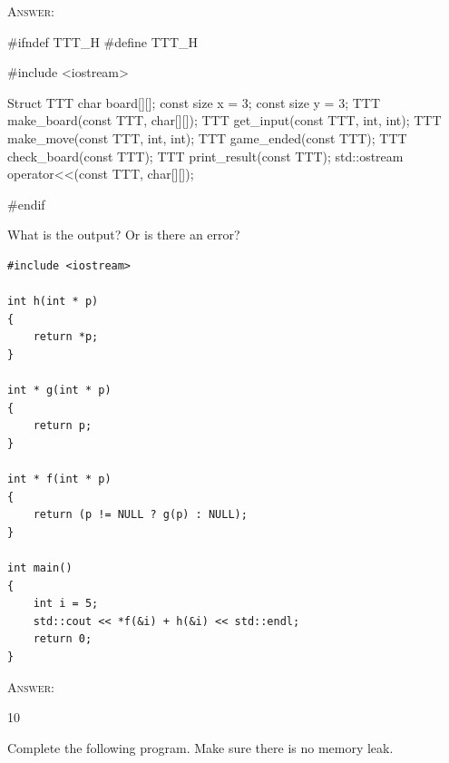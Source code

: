 \textsc{Answer:}\vspace{-2mm}
\begin{answercode}
#ifndef TTT_H
#define TTT_H

#include <iostream>

Struct TTT
{
  char board[][];
  const size x = 3;
  const size y = 3;
}
TTT make_board(const TTT, char[][]);
TTT get_input(const TTT, int, int);
TTT make_move(const TTT, int, int);
TTT game_ended(const TTT);
TTT check_board(const TTT);
TTT print_result(const TTT);
std::ostream operator<<(const TTT, char[][]);

#endif
\end{answercode}

\newpage
\nextq
What is the output? Or is there an error?
\begin{Verbatim}[frame=single,fontsize=\small]
#include <iostream>

int h(int * p)
{
    return *p;
}

int * g(int * p)
{
    return p;
}

int * f(int * p)
{
    return (p != NULL ? g(p) : NULL);
}

int main()
{
    int i = 5;
    std::cout << *f(&i) + h(&i) << std::endl;
    return 0;
}
\end{Verbatim}

\textsc{Answer:}\vspace{-2mm}
\begin{answercode}

10

\end{answercode}

\newpage
\nextq
Complete the following program. Make sure there is no memory leak.

